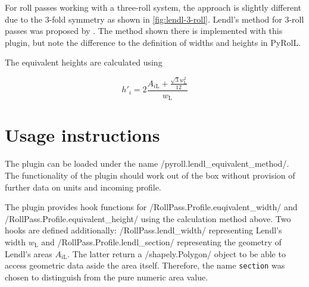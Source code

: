 \documentclass{PyRollDocs}
\begin{document}
    For roll passes working with a three-roll system, the approach is slightly different due to the 3-fold symmetry as shown in \autoref{fig:lendl-3-roll}.
    Lendl's method for 3-roll passes was proposed by \textcite{Overhagen2014}.
    The method shown there is implemented with this plugin, but note the difference to the definition of widths and heights in PyRolL\@.

    The equivalent heights are calculated using

    \begin{equation}
        h'_i = 2 \frac{A_{i\mathrm L} + \frac{\sqrt 3 w_{\mathrm L}^2}{12}}{w_{\mathrm L}}
        \label{eq:equivalent_height3}
    \end{equation}


    \section{Usage instructions}\label{sec:usage-instructions}

    The plugin can be loaded under the name \py/pyroll.lendl_equivalent_method/.
    The functionality of the plugin should work out of the box without provision of further data on units and incoming profile.

    The plugin provides hook functions for \py/RollPass.Profile.euqivalent_width/ and \py/RollPass.Profile.equivalent_height/ using the calculation method above.
    Two hooks are defined additionally: \py/RollPass.lendl_width/ representing Lendl's width $w_{\mathrm L}$ and \py/RollPass.Profile.lendl_section/ representing the geometry of Lendl's areas $A_{i \mathrm L}$.
    The latter return a \py/shapely.Polygon/ object to be able to access geometric data aside the area itself.
    Therefore, the name \texttt{section} was chosen to distinguish from the pure numeric area value.

    \printbibliography
\end{document}
